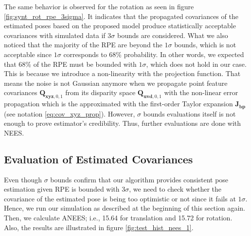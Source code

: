 \documentclass[a4paper]{report}
\numberwithin{figure}{section}
\begin{document}
The same behavior is observed for the rotation as seen in figure 
\ref{fig:synt_rot_rpe_3sigma}. It indicates that the propagated covariances of 
the estimated poses based on the proposed model produce statistically 
acceptable covariances with simulated data if $3\sigma$ bounds are 
considered.  What we also noticed that the majority of the RPE are beyond the 
$1\sigma$ bounds, which is not acceptable since $1\sigma$ corresponds to 68\% 
probability.  In other words, we expected that 68\% of the RPE must be bounded 
with $1\sigma$, which does not hold in our case. This is because we introduce 
a non-linearity with the projection function. That means the noise is not 
Gaussian anymore when we propagate point feature covariances 
$\mathbf{Q}_{\mathbf{xyz},0,1}$ from its disparity space 
$\mathbf{Q}_{\mathbf{uvd},0,1}$ with the non-linear error propagation which is 
the approximated with the first-order Taylor expansion $\mathbf{J_{bp}}$ (see 
notation \eqref{eq:cov_xyz_prop}).  However, $\sigma$ bounds evaluations 
itself is not enough to prove estimator's credibility. Thus, further 
evaluations are done with NEES.

\subsection{Evaluation of Estimated Covariances}

Even though $\sigma$ bounds confirm that our algorithm provides consistent pose estimation given RPE is bounded with $3\sigma$, we need to check whether the covariance of the estimated pose is being too optimistic or not since it fails at $1\sigma$.  Hence, we run our simulation as described at the beginning of this section again.  Then, we calculate ANEES; i.e., 15.64 for translation and 15.72 for rotation.  Also, the results are illustrated in figure \ref{fig:test_hist_nees_1}.
\end{document}
